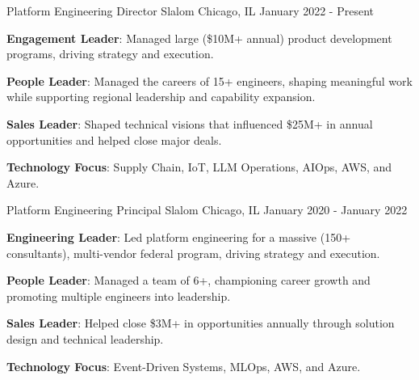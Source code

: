 

\begin{cventries}

  \cventry
    {Platform Engineering Director} %
    {Slalom} %
    {Chicago, IL} %
    {January 2022 - Present} %
    {
      \begin{cvitems} %
        \item {\textbf{Engagement Leader}: Managed large (\$10M+ annual) product development programs, driving strategy and execution.}
        \item {\textbf{People Leader}: Managed the careers of 15+ engineers, shaping meaningful work while supporting regional leadership and capability expansion.}
        \item {\textbf{Sales Leader}: Shaped technical visions that influenced \$25M+ in annual opportunities and helped close major deals.}
        \item {\textbf{Technology Focus}: Supply Chain, IoT, LLM Operations, AIOps, AWS, and Azure.}
      \end{cvitems}
    }

  \cventry
    {Platform Engineering Principal} %
    {Slalom} %
    {Chicago, IL} %
    {January 2020 - January 2022} %
    {
      \begin{cvitems} %
        \item {\textbf{Engineering Leader}: Led platform engineering for a massive (150+ consultants), multi-vendor federal program, driving strategy and execution.}
        \item {\textbf{People Leader}: Managed a team of 6+, championing career growth and promoting multiple engineers into leadership.}
        \item {\textbf{Sales Leader}: Helped close \$3M+ in opportunities annually through solution design and technical leadership.}
        \item {\textbf{Technology Focus}: Event-Driven Systems, MLOps, AWS, and Azure.}
      \end{cvitems}
    }


\end{cventries}

